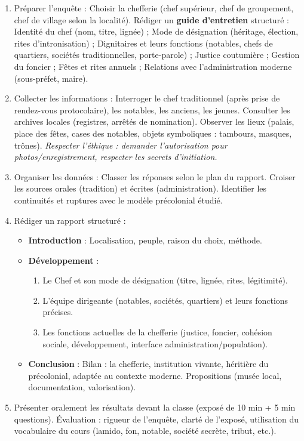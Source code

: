 \documentclass[11pt]{article}
\newcommand{\cle}[1]{{\popxbold\color{popdark}#1}}
\begin{document}
\begin{methode}
\begin{enumerate}
\item \cle{Préparer l'enquête} : Choisir la chefferie (chef supérieur, chef de groupement, chef de village selon la localité). Rédiger un \textbf{guide d'entretien} structuré : Identité du chef (nom, titre, lignée) ; Mode de désignation (héritage, élection, rites d'intronisation) ; Dignitaires et leurs fonctions (notables, chefs de quartiers, sociétés traditionnelles, porte-parole) ; Justice coutumière ; Gestion du foncier ; Fêtes et rites annuels ; Relations avec l'administration moderne (sous-préfet, maire).
\item \cle{Collecter les informations} : Interroger le chef traditionnel (après prise de rendez-vous protocolaire), les notables, les anciens, les jeunes. Consulter les archives locales (registres, arrêtés de nomination). Observer les lieux (palais, place des fêtes, cases des notables, objets symboliques : tambours, masques, trônes). \emph{Respecter l'éthique : demander l'autorisation pour photos/enregistrement, respecter les secrets d'initiation.}
\item \cle{Organiser les données} : Classer les réponses selon le plan du rapport. Croiser les sources orales (tradition) et écrites (administration). Identifier les continuités et ruptures avec le modèle précolonial étudié.
\item \cle{Rédiger un rapport structuré} :
  \begin{itemize}
  \item \textbf{Introduction} : Localisation, peuple, raison du choix, méthode.
  \item \textbf{Développement} : 
    \begin{enumerate}
    \item Le Chef et son mode de désignation (titre, lignée, rites, légitimité).
    \item L'équipe dirigeante (notables, sociétés, quartiers) et leurs fonctions précises.
    \item Les fonctions actuelles de la chefferie (justice, foncier, cohésion sociale, développement, interface administration/population).
    \end{enumerate}
  \item \textbf{Conclusion} : Bilan : la chefferie, institution vivante, héritière du précolonial, adaptée au contexte moderne. Propositions (musée local, documentation, valorisation).
  \end{itemize}
\item \cle{Présenter oralement} les résultats devant la classe (exposé de 10 min + 5 min questions). Évaluation : rigueur de l'enquête, clarté de l'exposé, utilisation du vocabulaire du cours (lamido, fon, notable, société secrète, tribut, etc.).
\end{enumerate}
\end{methode}
\end{document}
